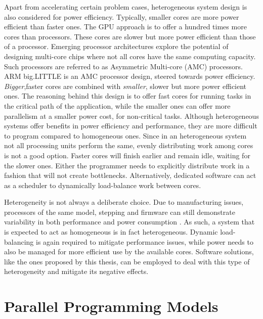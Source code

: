 Apart from accelerating certain problem cases, heterogeneous system design is also
considered for power efficiency.  Typically, smaller cores are more power efficient than
faster ones.  The GPU approach is to offer a hundred times more cores than processors.
These cores are slower but more power efficient than those of a processor.  Emerging
processor architectures explore the potential of designing multi-core chips where not all
cores have the same computing capacity.  Such processors are referred to as Asymmetric
Multi-core (AMC) processors.   ARM big.LITTLE is an AMC processor design, steered towards
power efficiency.  \emph{Bigger},faster cores are combined with \emph{smaller}, slower but
more power efficient ones.  The reasoning behind this design is to offer fast cores for
running tasks in the critical path of the application, while the smaller ones can offer
more parallelism at a smaller power cost, for non-critical tasks.  Although heterogeneous
systems offer benefits in power efficiency and performance, they are more difficult to
program compared to homogeneous ones.  Since in an heterogeneous system not all processing
units perform the same, evenly distributing work among cores is not a good option.  Faster
cores will finish earlier and remain idle, waiting for the slower ones.  Either the
programmer needs to explicitly distribute work in a fashion that will not create
bottlenecks.  Alternatively, dedicated software can act as a scheduler to dynamically
load-balance work between cores.   

Heterogeneity is not always a deliberate choice.  Due to manufacturing issues, processors
of the same model, stepping and firmware can still demonstrate variability in both
performance and power consumption \cite{Marathe:2017:ESP:3149412.3149421,Rountree2012}.
As such, a system that is expected to act as homogeneous is in fact heterogeneous.
Dynamic load-balancing is again required to mitigate performance issues, while power needs
to also be managed for more efficient use by the available cores.  Software solutions,
like the ones proposed by this thesis, can be employed to deal with this type of
heterogeneity and mitigate its negative effects.

\section{Parallel Programming Models}
\label{sec:parallel_programming_models}

%
%
